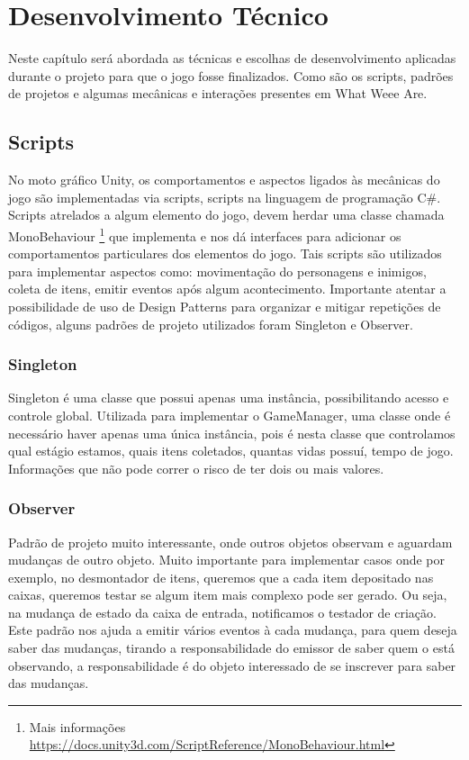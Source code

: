 \chapter{Desenvolvimento Técnico}
Neste capítulo será abordada as técnicas e escolhas de desenvolvimento aplicadas durante o projeto para que o jogo fosse finalizados. Como são os scripts, padrões de projetos e algumas mecânicas e interações presentes em What Weee Are.

\label{desenvolvimento_tecnico}
\section{Scripts}
No moto gráfico Unity, os comportamentos e aspectos ligados às mecânicas do jogo são implementadas via scripts, scripts na linguagem de programação C\#. Scripts atrelados a algum elemento do jogo, devem herdar uma classe chamada MonoBehaviour \footnote{Mais informações \url{https://docs.unity3d.com/ScriptReference/MonoBehaviour.html}} que implementa e nos dá interfaces para adicionar os comportamentos particulares dos elementos do jogo.
Tais scripts são utilizados para implementar aspectos como: movimentação do personagens e inimigos, coleta de itens, emitir eventos após algum acontecimento. Importante atentar a possibilidade de uso de Design Patterns para organizar e mitigar repetições de códigos, alguns padrões de projeto utilizados foram Singleton e Observer.
\subsection{Singleton}
Singleton é uma classe que possui apenas uma instância, possibilitando acesso e controle global. Utilizada para implementar o GameManager, uma classe onde é necessário haver apenas uma única instância, pois é nesta classe que controlamos qual estágio estamos, quais itens coletados, quantas vidas possuí, tempo de jogo. Informações que não pode correr o risco de ter dois ou mais valores.

\subsection{Observer}
Padrão de projeto muito interessante, onde outros objetos observam e aguardam mudanças de outro objeto. Muito importante para implementar casos onde por exemplo, no desmontador de itens, queremos que a cada item depositado nas caixas, queremos testar se algum item mais complexo pode ser gerado. Ou seja, na mudança de estado da caixa de entrada, notificamos o testador de criação. Este padrão nos ajuda a emitir vários eventos à cada mudança, para quem deseja saber das mudanças, tirando a responsabilidade do emissor de saber quem o está observando, a responsabilidade é do objeto interessado de se inscrever para saber das mudanças.

